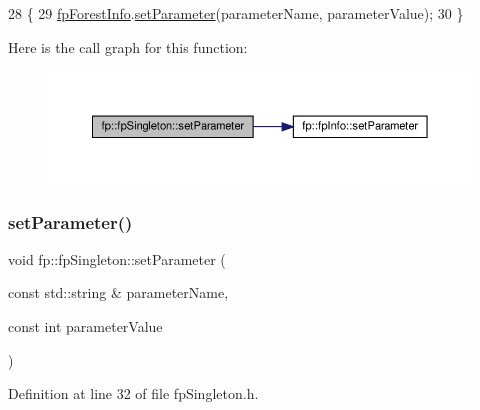 \begin{DoxyCode}
28                                                                                                  \{
29                 \hyperlink{classfp_1_1fpSingleton_a85965009befa72a749ae498fa5b6ccfa}{fpForestInfo}.\hyperlink{classfp_1_1fpInfo_ae4c749c466e983cb312cc08d38b2796e}{setParameter}(parameterName, parameterValue);
30             \}
\end{DoxyCode}
Here is the call graph for this function\+:\nopagebreak
\begin{figure}[H]
\begin{center}
\leavevmode
\includegraphics[width=350pt]{classfp_1_1fpSingleton_a19dd80e98acb4dd3e82be5e744840d1f_cgraph}
\end{center}
\end{figure}
\mbox{\label{classfp_1_1fpSingleton_a3465c3ff9376fae2933d9267c32761ca}} 
\subsubsection{\texorpdfstring{set\+Parameter()}{setParameter()}\hspace{0.1cm}{\footnotesize\ttfamily [3/3]}}
{\footnotesize\ttfamily void fp\+::fp\+Singleton\+::set\+Parameter (\begin{DoxyParamCaption}\item[{const std\+::string \&}]{parameter\+Name,  }\item[{const int}]{parameter\+Value }\end{DoxyParamCaption})\hspace{0.3cm}{\ttfamily [inline]}}



Definition at line 32 of file fp\+Singleton.\+h.


